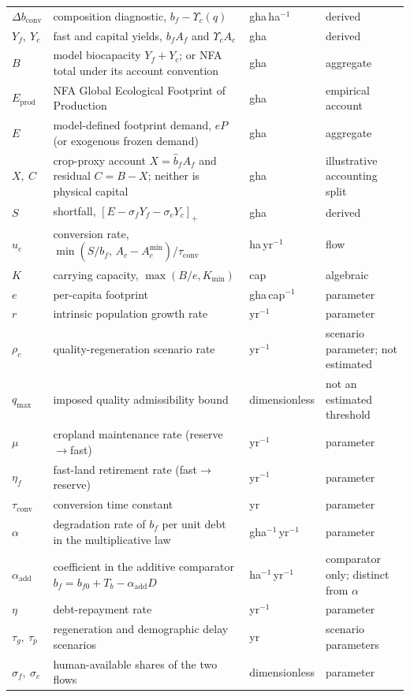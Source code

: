 \documentclass[11pt,a4paper]{article}
\newcommand{\pos}[1]{\left[#1\right]_+}
\newcommand{\dconv}{\Delta b_{\mathrm{conv}}}
\newcommand{\Ups}{\Upsilon_c}
\newcommand{\Acmin}{A_c^{\min}}
\newcommand{\tconv}{\tau_{\mathrm{conv}}}
\begin{document}
\begin{longtable}{>{\raggedright\arraybackslash}p{}>{\raggedright\arraybackslash}p{}>{\raggedright\arraybackslash}p{}>{\raggedright\arraybackslash}p{}}
$\dconv$ & composition diagnostic, $b_f-\Ups(q)$ & gha\,ha$^{-1}$ & derived \\
$Y_f,\ Y_c$ & fast and capital yields, $b_fA_f$ and $\Ups A_c$ & gha & derived \\
$B$ & model biocapacity $Y_f+Y_c$; or NFA total under its account convention & gha & aggregate \\
$E_{\mathrm{prod}}$ & NFA Global Ecological Footprint of Production & gha & empirical account \\
$E$ & model-defined footprint demand, $eP$ (or exogenous frozen demand) & gha & aggregate \\
$X,\ C$ & crop-proxy account $X=\hat b_fA_f$ and residual $C=B-X$; neither is physical capital & gha & illustrative accounting split \\
$S$ & shortfall, $\pos{E-\sigma_fY_f-\sigma_cY_c}$ & gha & derived \\
$u_c$ & conversion rate, $\min(S/b_f,\,A_c-\Acmin)/\tconv$ & ha\,yr$^{-1}$ & flow \\
$K$ & carrying capacity, $\max(B/e,K_{\min})$ & cap & algebraic \\
$e$ & per-capita footprint & gha\,cap$^{-1}$ & parameter \\
$r$ & intrinsic population growth rate & yr$^{-1}$ & parameter \\
$\rho_c$ & quality-regeneration scenario rate & yr$^{-1}$ & scenario parameter; not estimated \\
$q_{\max}$ & imposed quality admissibility bound & dimensionless & not an estimated threshold \\
$\mu$ & cropland maintenance rate (reserve$\to$fast) & yr$^{-1}$ & parameter \\
$\eta_f$ & fast-land retirement rate (fast$\to$reserve) & yr$^{-1}$ & parameter \\
$\tconv$ & conversion time constant & yr & parameter \\
$\alpha$ & degradation rate of $b_f$ per unit debt in the multiplicative law & gha$^{-1}$\,yr$^{-1}$ & parameter \\
$\alpha_{\mathrm{add}}$ & coefficient in the additive comparator $b_f=b_{f0}+T_b-\alpha_{\mathrm{add}}D$ & ha$^{-1}$\,yr$^{-1}$ & comparator only; distinct from $\alpha$ \\
$\eta$ & debt-repayment rate & yr$^{-1}$ & parameter \\
$\tau_g,\ \tau_p$ & regeneration and demographic delay scenarios & yr & scenario parameters \\
$\sigma_f,\ \sigma_c$ & human-available shares of the two flows & dimensionless & parameter \\

\end{longtable}
\end{document}

